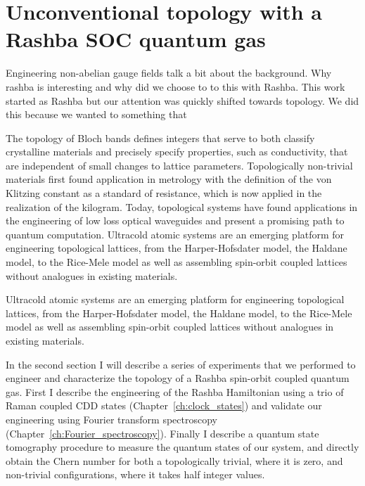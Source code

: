 
\renewcommand{\thechapter}{8}

\chapter{Unconventional topology with a Rashba SOC quantum gas}
\label{ch:Rashba}

Engineering non-abelian gauge fields 
talk a bit about the background. Why rashba is interesting and why did we choose to to this with Rashba. 
This work started as Rashba but our attention was quickly shifted towards topology. We did this because we wanted to something that 

 The topology of Bloch bands defines integers that serve to both classify crystalline materials and precisely specify properties, such as conductivity, that are independent of small changes to lattice parameters\cite{hasan_colloquium:_2010}. Topologically non-trivial materials first found application in metrology with the definition of the von Klitzing constant as a standard of resistance, which is now applied in the realization of the kilogram\cite{newell_codata_2018}. Today, topological systems have found applications in the engineering of low loss optical waveguides\cite{ozawa_topological_2019} and present a promising path to quantum computation\cite{nayak_non-abelian_2008}. Ultracold atomic systems are an emerging platform for engineering topological lattices, from the Harper-Hofsdater model\cite{miyake_realizing_2013,aidelsburger_realization_2013}, the Haldane model\cite{jotzu_experimental_2014}, to the Rice-Mele model\cite{lu_geometrical_2016,lohse_thouless_2016} as well as assembling spin-orbit coupled lattices without analogues in existing materials\cite{wu_realization_2016,sun_highly_2018}.


Ultracold atomic systems are an emerging platform for engineering topological lattices, from the Harper-Hofsdater model\cite{miyake_realizing_2013,aidelsburger_realization_2013}, the Haldane model\cite{jotzu_experimental_2014}, to the Rice-Mele model\cite{lu_geometrical_2016,lohse_thouless_2016} as well as assembling spin-orbit coupled lattices without analogues in existing materials\cite{wu_realization_2016,sun_highly_2018}. 

 In the second section I will describe a series of experiments that we performed to engineer and characterize the topology of a Rashba spin-orbit coupled quantum gas. First I describe the engineering of the Rashba Hamiltonian using a trio of Raman coupled CDD states (Chapter~\ref{ch:clock_states}) and validate our engineering using Fourier transform spectroscopy (Chapter~\ref{ch:Fourier_spectroscopy}). Finally I describe a quantum state tomography procedure to measure the quantum states of our system, and directly obtain the Chern number for both a topologically trivial, where it is zero, and non-trivial configurations, where it takes half integer values. 

